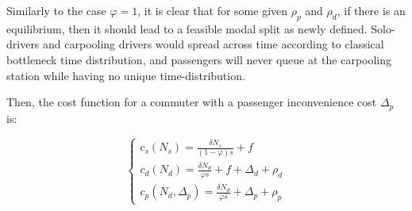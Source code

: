 \documentclass[english, a4paper]{article}
\theoremstyle{plain}
\theoremstyle{definition}
\theoremstyle{remark}
\begin{document}
Similarly to the case $\varphi = 1$, it is clear that for some given $\rho _p$ and $\rho _d$, if there is an equilibrium, then it should lead to a feasible modal split as newly defined. Solo-drivers and carpooling drivers would spread across time according to classical bottleneck time distribution, and passengers will never queue at the carpooling station while having no unique time-distribution.

Then, the cost function for a commuter with a passenger inconvenience cost $\Delta _p$ is:

\begin{equation}
    \left\{
    \begin{array}{l}
        c_s(N_s) = \frac{\delta N_s}{(1-\varphi )s} + f\\
        c_d(N_d) = \frac{\delta N_d}{\varphi s} + f + \Delta _d + \rho _d\\
        c_p(N_d, \Delta _p) = \frac{\delta N_d}{\varphi s} + \Delta _p + \rho _p       
    \end{array}
    \right.
\end{equation}
\end{document}

